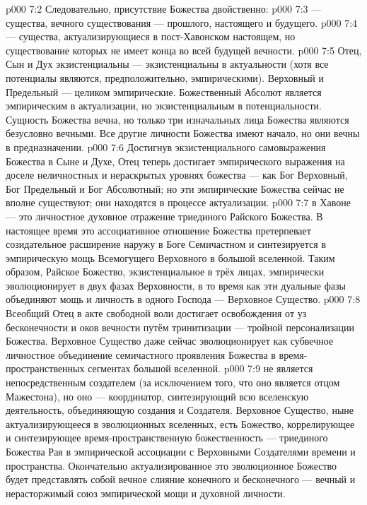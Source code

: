 \vs p000 7:2 Следовательно, присутствие Божества двойственно:
\vs p000 7:3  --- существа, вечного существования --- прошлого, настоящего и будущего.
\vs p000 7:4  --- существа, актуализирующиеся в пост\hyp{}Хавонском настоящем, но существование которых не имеет конца во всей будущей вечности.
\vs p000 7:5 \pc Отец, Сын и Дух экзистенциальны --- экзистенциальны в актуальности (хотя все потенциалы являются, предположительно, эмпирическими). Верховный и Предельный --- целиком эмпирические. Божественный Абсолют является эмпирическим в актуализации, но экзистенциальным в потенциальности. Сущность Божества вечна, но только три изначальных лица Божества являются безусловно вечными. Все другие личности Божества имеют начало, но они вечны в предназначении.
\vs p000 7:6 Достигнув экзистенциального самовыражения Божества в Сыне и Духе, Отец теперь достигает эмпирического выражения на доселе неличностных и нераскрытых уровнях божества --- как Бог Верховный, Бог Предельный и Бог Абсолютный; но эти эмпирические Божества сейчас не вполне существуют; они находятся в процессе актуализации.
\vs p000 7:7 \pc {} в Хавоне --- это личностное духовное отражение триединого Райского Божества. В настоящее время это ассоциативное отношение Божества претерпевает созидательное расширение наружу в Боге Семичастном и синтезируется в эмпирическую мощь Всемогущего Верховного в большой вселенной. Таким образом, Райское Божество, экзистенциальное в трёх лицах, эмпирически эволюционирует в двух фазах Верховности, в то время как эти дуальные фазы объединяют мощь и личность в одного Господа --- Верховное Существо.
\vs p000 7:8 Всеобщий Отец в акте свободной воли достигает освобождения от уз бесконечности и оков вечности путём тринитизации --- тройной персонализации Божества. Верховное Существо даже сейчас эволюционирует как субвечное личностное объединение семичастного проявления Божества в время\hyp{}пространственных сегментах большой вселенной.
\vs p000 7:9 \pc {} не является непосредственным создателем (за исключением того, что оно является отцом Мажестона), но оно --- координатор, синтезирующий всю вселенскую деятельность, объединяющую создания и Создателя. Верховное Существо, ныне актуализирующееся в эволюционных вселенных, есть Божество, коррелирующее и синтезирующее время\hyp{}пространственную божественность --- триединого Божества Рая в эмпирической ассоциации с Верховными Создателями времени и пространства. Окончательно актуализированное это эволюционное Божество будет представлять собой вечное слияние конечного и бесконечного --- вечный и нерасторжимый союз эмпирической мощи и духовной личности.
